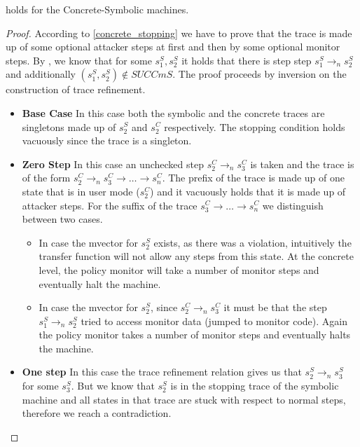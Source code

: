\begin{lemma}
  \label{ss_implies_cs}
   holds for the Concrete-Symbolic machines.
\end{lemma}
\begin{proof}
  According to \cref{concrete_stopping} we have to prove that the
  trace is made up of some optional attacker steps at first and then
  by some optional monitor steps. By , we
  know that for some $s^S_1, s^S_2$ it holds that there is step
  step $s^S_1 \to_n s^S_2$ and additionally $(s^S_1,s^S_2) \not \in
  SUCCm{S}$. The proof proceeds by inversion on the construction of
  trace refinement.
  \begin{itemize}
  \item \textbf{Base Case} In this case both the symbolic and
    the concrete traces are singletons made up of
    $s^S_2$ and $s^C_2$ respectively. The stopping condition
    holds vacuously since the trace is a singleton.
  \item \textbf{Zero Step} In this case an unchecked step $s^C_2 \to_n
    s^C_3$ is taken and the trace is of the form $s^C_2 \to_n s^C_3 \to
    \ldots \to s^C_n$. The prefix of the trace is made up of one
    state that is in user mode ($s^C_2$) and it vacuously holds that
    it is made up of attacker steps. For the suffix of the trace
    $s^C_3 \to \ldots \to s^C_n$ we distinguish between two cases.
    \begin{itemize}
    \item In case the mvector for $s^S_2$ exists, as there was a
      violation, intuitively the transfer function will not allow any
      steps from this state. At the concrete level, the policy monitor
      will take a number of monitor steps and eventually halt the
      machine.
    \item In case the mvector for $s^S_2$, since $s^C_2 \to_n s^C_3$
      it must be that the step $s^S_1 \to_n s^S_2$ tried to access
      monitor data (\EG jumped to monitor code). Again the policy
      monitor takes a number of monitor steps and eventually
      halts the machine.
    \end{itemize}
  \item \textbf{One step} In this case the trace refinement relation
    gives us that $s^S_2 \to_n s^S_3$ for some $s^S_3$. But we know
    that $s^S_2$ is in the stopping trace of the symbolic machine and
    all states in that trace are stuck with respect to normal steps,
    therefore we reach a contradiction.

\end{itemize}
\end{proof}

